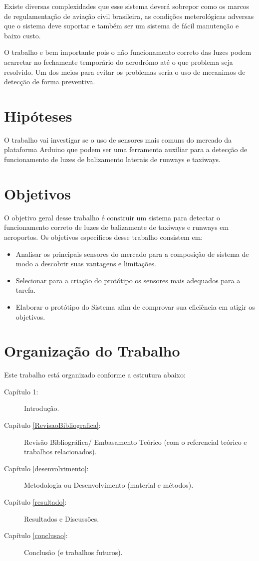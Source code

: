 Existe diversas complexidades que esse sistema deverá sobrepor como os marcos de regulamentação de aviação civil brasileira, as condições meterológicas adversas que o sistema deve suportar e também ser um sistema de fácil manutenção e baixo custo.

O trabalho e bem importante pois o não funcionamento correto das luzes podem acarretar no fechamente temporário do aerodrómo até o que problema seja resolvido. Um dos meios para evitar os problemas seria o uso de mecanimos de detecção de forma preventiva. 

\section{Hipóteses}

O trabalho vai investigar se o uso de sensores mais comuns do mercado da plataforma Arduino que podem ser uma ferramenta auxiliar para a detecção de funcionamento de luzes de balizamento laterais de runways e taxiways.

\section{Objetivos}

O objetivo geral desse trabalho é construir um sistema para detectar o funcionamento correto de luzes de balizamente de taxiways e runways em aeroportos. Os objetivos especificos desse trabalho consistem em:
\begin{itemize}
    \item Analisar os principais sensores do mercado para a composição de sistema de modo a descobrir suas vantagens e limitações.
    \item Selecionar para a criação do protótipo os sensores mais adequados para a tarefa.
    \item Elaborar o protótipo do Sistema afim de comprovar sua eficiência em atigir os objetivos.
\end{itemize}

\section{Organização do Trabalho}

Este trabalho está organizado conforme a estrutura abaixo:

\begin{description}
   \item[Capítulo 1:] Introdução.
   \item[Capítulo \ref{RevisaoBibliografica}:] Revisão Bibliográfica/ Embasamento Teórico (com o referencial teórico e trabalhos relacionados).
   \item[Capítulo \ref{desenvolvimento}:] Metodologia ou Desenvolvimento (material e métodos).
   \item[Capítulo \ref{resultado}:] Resultados e Discussões.
   \item[Capítulo \ref{conclusao}:] Conclusão (e trabalhos futuros).
\end{description}


 









